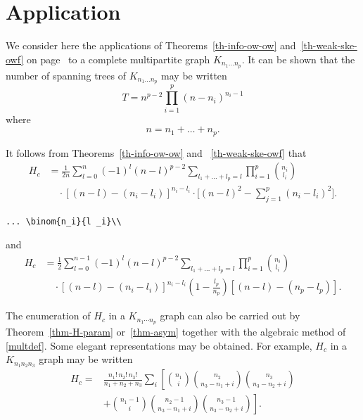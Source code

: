 \documentclass[manuscript, printscheme]{aomart}
\newtheorem[{}\it]{thm}{Theorem}[section]
\theoremstyle{definition}
\newtheorem*[{}\it]{notation}{Notation}
\begin{document}
\section{Application}
\label{lincomp}

We consider here the applications of Theorems~\ref{th-info-ow-ow}
and~\ref{th-weak-ske-owf} on page~\pageref{th-weak-ske-owf} to a complete
multipartite graph $K_{n_1\dots n_p}$. It can be shown that the
number of spanning trees of $K_{n_1\dots n_p}$
may be written
\begin{equation}\label{e:st}
T=n^{p-2}\prod^p_{i=1}
(n-n_i)^{n_i-1}
\end{equation}
where
\begin{equation}
n=n_1+\dots+n_p.
\end{equation}

It follows from Theorems~\ref{th-info-ow-ow} and
~\ref{th-weak-ske-owf} that
\begin{equation}\label{e:barwq}
\begin{split}
H_c&=\frac1{2n}
\sum^n_{{l}=0}(-1)^{l}(n-{l})^{p-2}
\sum_{l _1+\dots+l _p=l}\prod^p_{i=1}
\binom{n_i}{l _i}\\
&\quad\cdot[(n-l )-(n_i-l _i)]^{n_i-l _i}\cdot
\biggl[(n-l )^2-\sum^p_{j=1}(n_i-l _i)^2\biggr].\end{split}
\end{equation}
\begin{verbatim}
... \binom{n_i}{l _i}\\
\end{verbatim}
and
\begin{equation}\label{joe}
\begin{split}
H_c&=\frac12\sum^{n-1}_{l =0}
(-1)^{l}(n-l )^{p-2}
\sum_{l _1+\dots+l _p=l}
\prod^p_{i=1}\binom{n_i}{l _i}\\
&\quad\cdot[(n-l )-(n_i-l _i)]^{n_i-l _i}
\left(1-\frac{l _p}{n_p}\right)
[(n-l )-(n_p-l _p)].
\end{split}
\end{equation}

The enumeration of $H_c$ in a $K_{n_1\dotsm n_p}$ graph can also be
carried out by Theorem~\ref{thm-H-param} or~\ref{thm-asym}
together with the algebraic method of \eqref{multdef}.
Some elegant representations may be obtained. For example, $H_c$ in
a $K_{n_1n_2n_3}$ graph may be written
\begin{equation}\label{j:mark}
\begin{split}
H_c=&
\frac{n_1!\,n_2!\,n_3!}
{n_1+n_2+n_3}\sum_i\left[\binom{n_1}{i}
\binom{n_2}{n_3-n_1+i}\binom{n_3}{n_3-n_2+i}\right.\\
&+\left.\binom{n_1-1}{i}
\binom{n_2-1}{n_3-n_1+i}
\binom{n_3-1}{n_3-n_2+i}\right].\end{split}
\end{equation}
\end{document}
